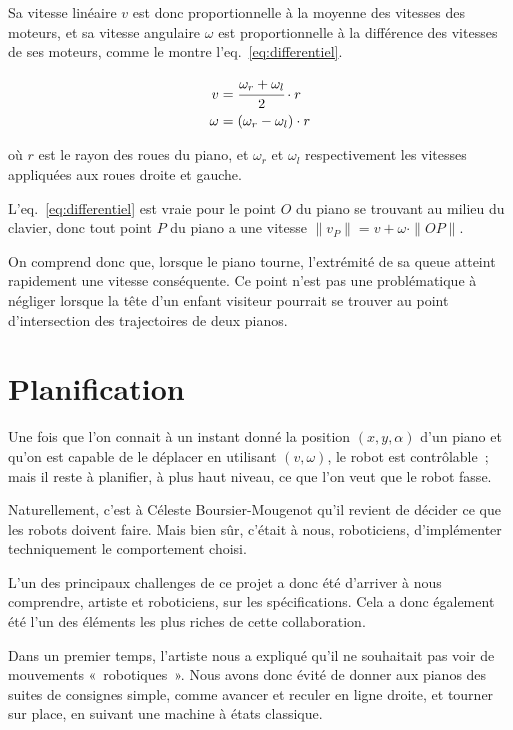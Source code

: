 \documentclass[french,A4paper,]{book}
\begin{document}
Sa vitesse linéaire \(v\) est donc proportionnelle à la moyenne des
vitesses des moteurs, et sa vitesse angulaire \(\omega\) est
proportionnelle à la différence des vitesses de ses moteurs, comme le
montre l'eq.~\ref{eq:differentiel}.

\begin{equation}
\begin{aligned}
v &= \cfrac{\omega_r + \omega_l}{2} \cdot r \\
\omega &= (\omega_r - \omega_l) \cdot r
\end{aligned}
\label{eq:differentiel}\end{equation}

où \(r\) est le rayon des roues du piano, et \(\omega_r\) et
\(\omega_l\) respectivement les vitesses appliquées aux roues droite et
gauche.

L'eq.~\ref{eq:differentiel} est vraie pour le point \(O\) du piano se
trouvant au milieu du clavier, donc tout point \(P\) du piano a une
vitesse \(\|v_P\| = v + \omega \cdot \| OP \|\).

On comprend donc que, lorsque le piano tourne, l'extrémité de sa queue
atteint rapidement une vitesse conséquente. Ce point n'est pas une
problématique à négliger lorsque la tête d'un enfant visiteur pourrait
se trouver au point d'intersection des trajectoires de deux pianos.

\section{Planification}\label{sec:planification}

Une fois que l'on connait à un instant donné la position
\((x, y, \alpha)\) d'un piano et qu'on est capable de le déplacer en
utilisant \((v, \omega)\), le robot est contrôlable~; mais il reste à
planifier, à plus haut niveau, ce que l'on veut que le robot fasse.

Naturellement, c'est à Céleste Boursier-Mougenot qu'il revient de
décider ce que les robots doivent faire. Mais bien sûr, c'était à nous,
roboticiens, d'implémenter techniquement le comportement choisi.

L'un des principaux challenges de ce projet a donc été d'arriver à nous
comprendre, artiste et roboticiens, sur les spécifications. Cela a donc
également été l'un des éléments les plus riches de cette collaboration.

Dans un premier temps, l'artiste nous a expliqué qu'il ne souhaitait pas
voir de mouvements «~robotiques~». Nous avons donc évité de donner aux
pianos des suites de consignes simple, comme avancer et reculer en ligne
droite, et tourner sur place, en suivant une machine à états classique.
\end{document}
